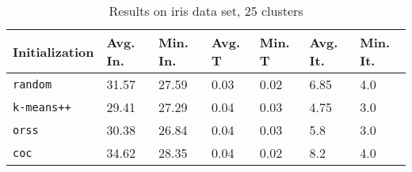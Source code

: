 \begin{table}[h]
	\begin{center}
		\begin{tabular}{|l|l|l|l|l|l|l|}
			\hline
			Initialization & Avg. In. & Min. In. & Avg. T & Min. T & Avg. It. & Min. It.\\\hline
			\texttt{random} & 31.57 & 27.59 & 0.03 & 0.02 & 6.85 & 4.0\\\hline
			\texttt{k-means++} & 29.41 & 27.29 & 0.04 & 0.03 & 4.75 & 3.0\\\hline
			\texttt{orss} & 30.38 & 26.84 & 0.04 & 0.03 & 5.8 & 3.0\\\hline
			\texttt{coc} & 34.62 & 28.35 & 0.04 & 0.02 & 8.2 & 4.0\\\hline
		\end{tabular}
		\caption{Results on iris data set, 25 clusters}
		\label{tbl:iris25}
	\end{center}
\end{table}

